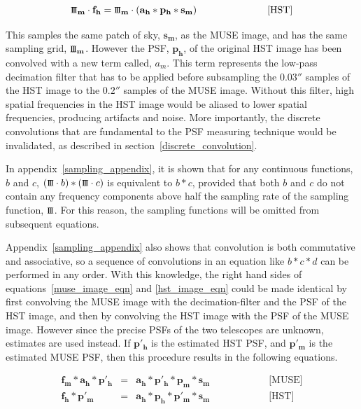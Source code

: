 \documentclass[12pt,twoside,a4paper]{article}
\newcommand{\sha}{\mbox{\small I\!I\!I}}
\newcommand{\arcsec}{''}
\newcommand{\msky}{\mathbf{s_m}}
\newcommand{\mpsf}{\mathbf{p_m}}
\newcommand{\hpsf}{\mathbf{p_h}}
\newcommand{\mepsf}{\mathbf{p'_m}}
\newcommand{\hepsf}{\mathbf{p'_h}}
\newcommand{\hlpf}{\mathbf{a_h}}
\newcommand{\mimg}{\mathbf{f_m}}
\newcommand{\himg}{\mathbf{f_h}}
\newcommand{\msha}{\mathbf{\sha_m}}
\begin{document}
\begin{equation}
\label{hst_image_eqn}
\msha \cdot \himg = \msha \cdot (\hlpf \ast \hpsf \ast \msky) \hspace{1in} \mbox{[HST]}
\end{equation}

This samples the same patch of sky, $\msky$, as the MUSE image, and
has the same sampling grid, $\msha$. However the PSF, $\hpsf$, of the
original HST image has been convolved with a new term called,
$a_m$. This term represents the low-pass decimation filter that has to
be applied before subsampling the $0.03\arcsec$ samples of the HST
image to the $0.2\arcsec$ samples of the MUSE image. Without this
filter, high spatial frequencies in the HST image would be aliased to
lower spatial frequencies, producing artifacts and noise. More
importantly, the discrete convolutions that are fundamental to the PSF
measuring technique would be invalidated, as described in
section~\ref{discrete_convolution}.

In appendix~\ref{sampling_appendix}, it is shown that for any
continuous functions, $b$ and $c$, $(\sha \cdot b)\ast (\sha \cdot
c)$ is equivalent to $b \ast c$, provided that both $b$ and $c$ do not
contain any frequency components above half the sampling rate of the
sampling function, $\sha$. For this reason, the sampling functions
will be omitted from subsequent equations. 

Appendix~\ref{sampling_appendix} also shows that convolution is both
commutative and associative, so a sequence of convolutions in an
equation like $b \ast c \ast d$ can be performed in any order. With
this knowledge, the right hand sides of equations~\ref{muse_image_eqn}
and \ref{hst_image_eqn} could be made identical by first convolving
the MUSE image with the decimation-filter and the PSF of the HST
image, and then by convolving the HST image with the PSF of the MUSE
image. However since the precise PSFs of the two telescopes are
unknown, estimates are used instead. If $\hepsf$ is the estimated HST
PSF, and $\mepsf$ is the estimated MUSE PSF, then this procedure
results in the following equations.

\begin{eqnarray}
\label{ideal_muse_conv}
\mimg \ast \hlpf \ast \hepsf &=& \hlpf \ast \hepsf \ast \mpsf \ast \msky
\hspace{1in} \mbox{[MUSE]}\\
\label{ideal_hst_conv}
\himg \ast \mepsf &=& \hlpf \ast \hpsf \ast \mepsf \ast \msky
\hspace{1in} \mbox{[HST]}
\end{eqnarray}
\end{document}
